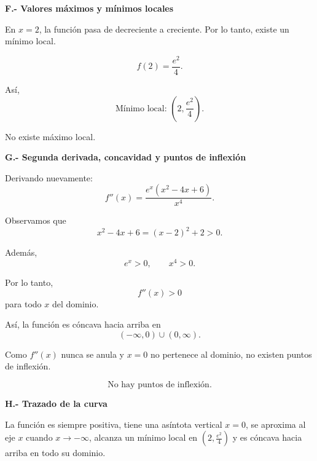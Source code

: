 \documentclass[12pt]{article}
\begin{document}
\begin{enumerate}[label=\alph*.-]
    \textbf{F.- Valores máximos y mínimos locales}

    En $x=2$, la función pasa de decreciente a creciente. Por lo tanto,
    existe un mínimo local.

    \[
    f(2)=\frac{e^2}{4}.
    \]

    Así,
    \[
    \boxed{
    \text{Mínimo local: }\left(2,\frac{e^2}{4}\right)
    }.
    \]

    No existe máximo local.

    \textbf{G.- Segunda derivada, concavidad y puntos de inflexión}

    Derivando nuevamente:
    \[
    f''(x)
    =
    \frac{e^x(x^2-4x+6)}{x^4}.
    \]

    Observamos que
    \[
    x^2-4x+6
    =
    (x-2)^2+2>0.
    \]

    Además,
    \[
    e^x>0,\qquad x^4>0.
    \]

    Por lo tanto,
    \[
    \boxed{f''(x)>0}
    \]
    para todo $x$ del dominio.

    Así, la función es cóncava hacia arriba en
    \[
    \boxed{(-\infty,0)\cup(0,\infty)}.
    \]

    Como $f''(x)$ nunca se anula y $x=0$ no pertenece al dominio,
    no existen puntos de inflexión.

    \[
    \boxed{\text{No hay puntos de inflexión.}}
    \]

    \textbf{H.- Trazado de la curva}

    La función es siempre positiva, tiene una asíntota vertical $x=0$,
    se aproxima al eje $x$ cuando $x\to-\infty$, alcanza un mínimo local
    en $\left(2,\frac{e^2}{4}\right)$ y es cóncava hacia arriba en todo
    su dominio.

    \begin{center}
    \end{center}



\end{enumerate}
\end{document}
